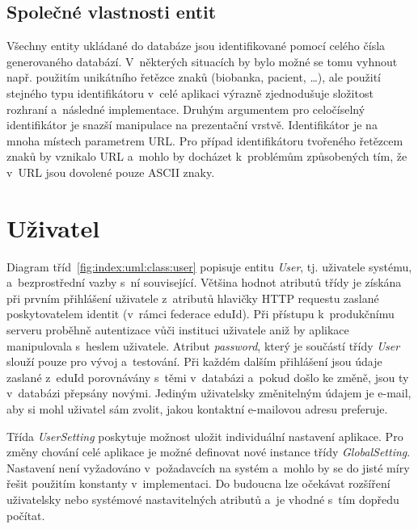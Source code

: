 \documentclass[11pt, draft, oneside]{fithesis2}
\begin{document}
\subsection{Společné vlastnosti entit}
Všechny entity ukládané do databáze jsou identifikované pomocí celého čísla generovaného databází. V~některých situacích by bylo možné se tomu vyhnout např. použitím unikátního řetězce znaků (biobanka, pacient, \ldots), ale použití stejného typu identifikátoru v~celé aplikaci výrazně zjednodušuje složitost rozhraní a~následné implementace. Druhým argumentem pro celočíselný identifikátor je snazší manipulace na prezentační vrstvě. Identifikátor je na mnoha místech parametrem URL. Pro případ identifikátoru tvořeného řetězcem znaků by vznikalo  URL a~mohlo by docházet k~problémům způsobených tím, že v~URL jsou dovolené pouze ASCII znaky.

\section{Uživatel}
Diagram tříd~\ref{fig:index:uml:class:user} popisuje entitu \textit{User}, tj. uživatele systému, a~bezprostřední vazby s~ní související. Většina hodnot atributů třídy je získána při prvním přihlášení uživatele z~atributů hlavičky HTTP requestu zaslané poskytovatelem identit (v~rámci federace eduId). Při přístupu k~produkčnímu serveru proběhně autentizace vůči  instituci uživatele aniž by aplikace manipulovala s~heslem uživatele. Atribut \textit{password}, který je součástí třídy \textit{User} slouží pouze pro vývoj a~testování. 
Při každém dalším přihlášení jsou údaje zaslané z~eduId porovnávány s~těmi v~databázi a~pokud došlo ke změně, jsou ty v~databázi přepsány novými. Jediným uživatelsky změnitelným údajem je e-mail, aby si mohl uživatel sám zvolit, jakou kontaktní e-mailovou adresu preferuje.

Třída \textit{UserSetting} poskytuje možnost uložit individuální nastavení aplikace.
Pro změny chování celé aplikace je možné definovat nové instance třídy \textit{GlobalSetting}. Nastavení není vyžadováno v~požadavcích na systém a~mohlo by se do jisté míry řešit použitím konstanty v~implementaci. Do budoucna lze očekávat rozšíření uživatelsky nebo systémové nastavitelných atributů a~je vhodné s~tím dopředu počítat.
\end{document}
